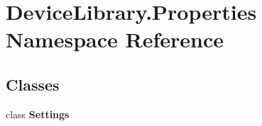 \hypertarget{namespace_device_library_1_1_properties}{}\section{Device\+Library.\+Properties Namespace Reference}
\label{namespace_device_library_1_1_properties}
\subsection*{Classes}
\begin{DoxyCompactItemize}
\item 
class {\bfseries Settings}
\end{DoxyCompactItemize}
